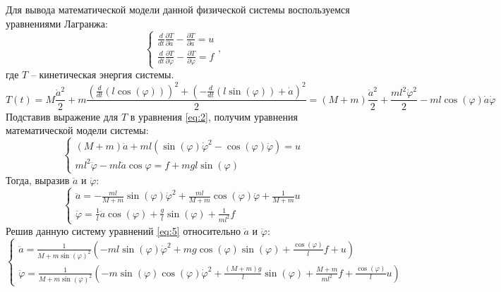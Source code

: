 Для вывода математической модели данной физической системы воспользуемся уравнениями Лагранжа:
\begin{equation} \label{eq:2}
    \begin{cases}
        \frac{d}{dt}\frac{\partial T}{\partial \dot{a}} - \frac{\partial T}{\partial a} = u \\
        \frac{d}{dt}\frac{\partial T}{\partial \dot{\varphi}} - \frac{\partial T}{\partial \varphi} = f 
    \end{cases},
\end{equation}
где $T$ -- кинетическая энергия системы.
\begin{equation} \label{eq:3}
    T(t) = M\frac{\dot{a}^2}{2} + m\frac{(\frac{d}{dt}(l\cos(\varphi)))^2 + (-\frac{d}{dt}(l\sin(\varphi)) + \dot{a})^2}{2}=
    (M+m)\frac{\dot{a}^2}{2} + \frac{ml^2\dot{\varphi}^2}{2} - ml\cos(\varphi)\dot{a}\dot{\varphi}
\end{equation}
Подставив выражение для $T$ в уравнения \ref{eq:2}, получим уравнения математической модели системы:
\begin{equation} \label{eq:4}
    \begin{cases}
        (M+m)\ddot{a} + ml(\sin(\varphi)\dot{\varphi}^2 - \cos(\varphi)\ddot{\varphi}) = u \\
        ml^2\ddot{\varphi} - ml\ddot{a}\cos{\varphi} = f + mgl\sin(\varphi)
    \end{cases}
\end{equation}
Тогда, выразив $\ddot{a}$ и $\ddot{\varphi}$:
\begin{equation} \label{eq:5}
    \begin{cases}
        \ddot a = -\frac{ml}{M+m}\sin(\varphi)\dot{\varphi}^2 + \frac{ml}{M+m}\cos(\varphi)\ddot{\varphi} + \frac{1}{M+m}u \\
        \ddot \varphi = \frac{1}{l}\ddot a \cos(\varphi) + \frac{g}{l}\sin(\varphi) + \frac{1}{ml^2}f
    \end{cases}
\end{equation}
Решив данную систему уравнений \ref{eq:5} относительно $\ddot a$ и $\ddot \varphi$:
\begin{equation} \label{eq:6}
    \begin{cases}
        \ddot a = \frac{1}{M + m\sin(\varphi)^2}( -ml\sin(\varphi)\dot{\varphi}^2 + mg\cos(\varphi)\sin(\varphi) + \frac{\cos(\varphi)}{l}f + u ) \\
        \ddot \varphi = \frac{1}{M + m\sin(\varphi)^2}( -m\sin(\varphi)\cos(\varphi)\dot{\varphi}^2 + \frac{(M+m)g}{l}\sin(\varphi) + \frac{M+m}{ml^2}f + \frac{\cos(\varphi)}{l}u )
    \end{cases}
\end{equation}

